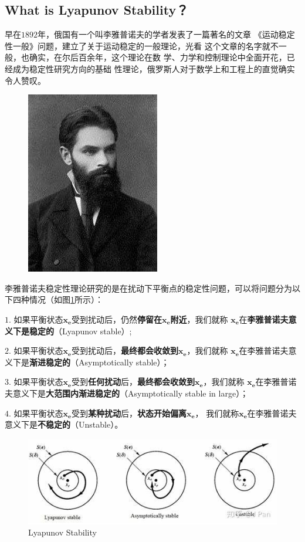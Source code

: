 \documentclass[lang=cn,10pt]{elegantbook}
\newcommand\bv[1]{\boldsymbol{#1}}
\begin{document}
\subsection*{What is Lyapunov Stability？}
早在$1892$年，俄国有一个叫李雅普诺夫的学者发表了一篇著名的文章
《运动稳定性一般》问题，建立了关于运动稳定的一般理论，光看
这个文章的名字就不一般，也确实，在尔后百余年，这个理论在数
学、力学和控制理论中全面开花，已经成为稳定性研究方向的基础
性理论，俄罗斯人对于数学上和工程上的直觉确实令人赞叹。
\begin{figure}[h]
	\centering
	\includegraphics[scale = 0.6]{img/Lyapunov.jpg}
	\caption{}
\end{figure}

李雅普诺夫稳定性理论研究的是在扰动下平衡点的稳定性问题，可以将问题分为以下四种情况（如图\ref{stable}所示）：
\par \textbf{$\mathit{1.}$}
如果平衡状态$\bv{x_e}$受到扰动后，仍然\textbf{停留在$\bv{x_e}$附近}，我们就称
$\bv{x_e}$在\textbf{李雅普诺夫意义下是稳定的}（Lyapunov stable）;

\textbf{$\mathit{2.}$}
如果平衡状态$\bv{x_e}$受到扰动后，\textbf{最终都会收敛到}$\bv{x_e}$，我们就称
$\bv{x_e}$在李雅普诺夫意义下是\textbf{渐进稳定的}（Asymptotically stable）；

\textbf{$\mathit{3.}$}
如果平衡状态$\bv{x_e}$受到\textbf{任何扰动}后，\textbf{最终都会收敛到}$\bv{x_e}$，我们就称
$\bv{x_e}$在李雅普诺夫意义下是\textbf{大范围内渐进稳定的}（Asymptotically stable in large）；

\textbf{$\mathit{4.}$}
如果平衡状态$\bv{x_e}$受到\textbf{某种扰动}后，\textbf{状态开始偏离}$\bv{x_e}$，
我们就称$\bv{x_e}$在李雅普诺夫意义下是\textbf{不稳定的}（Unstable）。

\begin{figure}[h]
	\centering
	\includegraphics[scale = 0.8]{img/stable.jpg}
	\caption{Lyapunov Stability}
	\label{stable}
\end{figure}
\end{document}
